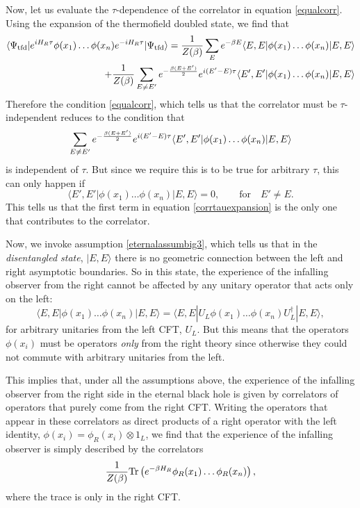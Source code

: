 \documentclass[12pt]{article}
\newcommand{\tfd}{\Psi_{\text{tfd}}} %
\def\tr{{\rm Tr}}
\newcommand{\be}{\begin{equation}}
\newcommand{\ee}{\end{equation}}
\begin{document}
Now, let us evaluate the $\tau$-dependence of the correlator in
equation \eqref{equalcorr}. Using the expansion of the thermofield doubled
state, we find that 
\be
\label{corrtauexpansion}
\begin{split}
\langle \tfd | e^{i H_R \tau} \phi(x_1) \ldots \phi(x_n) e^{-i H_R \tau} |\tfd \rangle = {1 \over Z(\beta)} \sum_{E} e^{-\beta E} \langle E, E | \phi(x_1) \ldots \phi(x_n) | E, E \rangle& \\ + {1 \over Z(\beta)} \sum_{E \neq E'} e^{-{\beta(E+ E') \over 2}}  e^{i (E' - E) \tau} \langle E', E'| \phi(x_1) \ldots \phi(x_n) |E, E \rangle&
\end{split}
\ee
Therefore the condition \eqref{equalcorr}, which tells us that the correlator must be $\tau$-independent reduces to the condition that
\[
\sum_{E \neq E'} e^{-{\beta(E+ E') \over 2}}  e^{i (E' - E) \tau} \langle E', E'| \phi(x_1) \ldots \phi(x_n) |E, E \rangle
\]
is independent of $\tau$. But since we require this is to be true for arbitrary $\tau$, this can only happen if 
\be
\langle E', E'| \phi(x_1) \ldots \phi(x_n) |E, E \rangle = 0, \qquad \text{for} \quad  E' \neq E.
\ee
This tells us that the first term in equation \eqref{corrtauexpansion} is the only one that contributes to the correlator.

Now, we invoke assumption \ref{eternalassumbig3}, which tells us that in the {\em disentangled state}, $| E, E \rangle$ there is no geometric connection between the left and right asymptotic boundaries. So in this state, the experience of the infalling observer from the right cannot be affected by any unitary operator that acts only on the left:
\be
\langle E, E | \phi(x_1) \ldots \phi(x_n) | E, E \rangle = \langle E, E | U_L \phi(x_1) \ldots \phi(x_n) U_L^{\dagger}| E, E \rangle,
\ee
for arbitrary unitaries from the left CFT, $U_L$. But this means that the operators $\phi(x_i)$ must be operators {\em only} from the right theory since otherwise they could not commute with arbitrary unitaries from the left. 

This implies that, under all the assumptions above, the experience of the infalling observer from the right side in the eternal black hole is given by correlators of operators that purely come from the right CFT. Writing the operators that appear in these correlators as direct products of a right operator with the left identity, $\phi(x_i) = \phi_R(x_i) \otimes 1_L$, we find that the experience of the infalling observer is simply described by the correlators
\be
{1 \over Z(\beta)} \tr\left(e^{-\beta H_R} \phi_R(x_1) \ldots \phi_R(x_n) \right),
\ee
where the trace is only in the right CFT.
\end{document}
